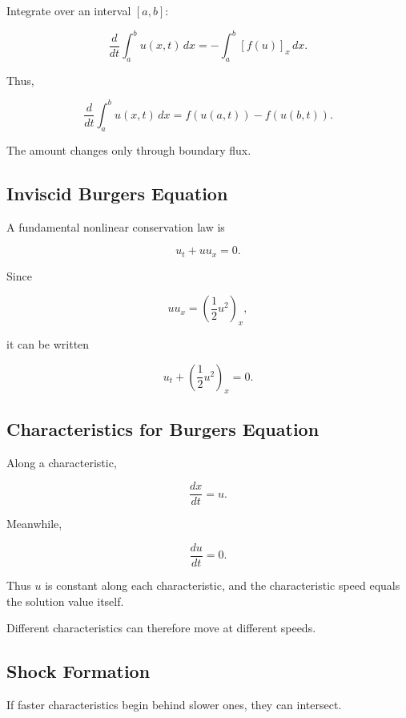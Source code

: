 Integrate over an interval \([a,b]\):

\[
\frac{d}{dt}
\int_a^b
u(x,t)\,dx
=
-
\int_a^b
[f(u)]_x\,dx.
\]

Thus,

\[
\boxed{
\frac{d}{dt}
\int_a^b
u(x,t)\,dx
=
f(u(a,t))
-
f(u(b,t)).
}
\]

The amount changes only through boundary flux.

\subsection{Inviscid Burgers Equation}
\label{subsec:inviscid-burgers}

A fundamental nonlinear conservation law is

\[
\boxed{
u_t
+
u u_x
=
0.
}
\]

Since

\[
u u_x
=
\left(
\frac12u^2
\right)_x,
\]

it can be written

\[
\boxed{
u_t
+
\left(
\frac12u^2
\right)_x
=
0.
}
\]

\subsection{Characteristics for Burgers Equation}
\label{subsec:burgers-characteristics}

Along a characteristic,

\[
\boxed{
\frac{dx}{dt}=u.
}
\]

Meanwhile,

\[
\boxed{
\frac{du}{dt}=0.
}
\]

Thus \(u\) is constant along each characteristic, and the characteristic
speed equals the solution value itself.

Different characteristics can therefore move at different speeds.

\subsection{Shock Formation}
\label{subsec:shock-formation}

If faster characteristics begin behind slower ones, they can intersect.

